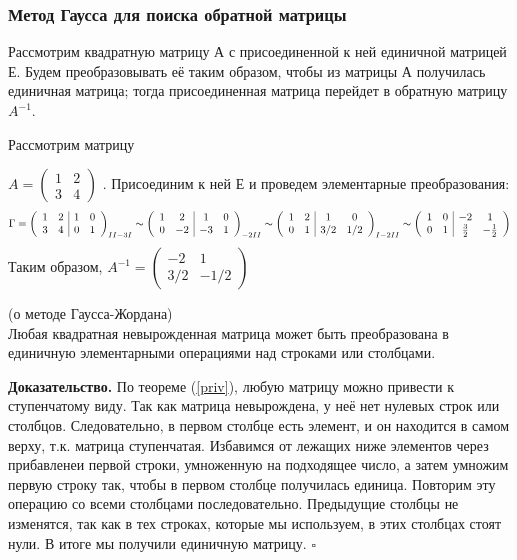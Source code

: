 \subsubsection{Метод Гаусса для поиска обратной матрицы}
Рассмотрим квадратную матрицу А с присоединенной к ней единичной матрицей Е.
Будем преобразовывать её таким образом, чтобы из матрицы А получилась единичная
матрица; тогда присоединенная матрица перейдет в обратную матрицу $A^{-1}$.
\begin{example}
Рассмотрим матрицу
\end{example}
$A=\left( \begin{array}{cc}
    1 &2\\
     3&4 
\end{array} \right)$ . Присоединим к ней Е и проведем элементарные 
преобразования:
$$\Gamma =\left( \begin{array}{ccccc}
    1 &2&\multicolumn{1}{|c}{1}&0 \\
     3&4&\multicolumn{1}{|c}{0}&1 
\end{array} \right)_{II-3I} \sim 
\left( \begin{array}{ccccc}
    1 &2&\multicolumn{1}{|c}{1}&0 \\
     0&-2&\multicolumn{1}{|c}{-3}&1 
\end{array} \right)_{-2II} \sim
\left( \begin{array}{ccccc}
    1 &2&\multicolumn{1}{|c}{1}&0 \\
     0&1&\multicolumn{1}{|c}{3/2}&1/2 
\end{array} \right)_{I-2II} \sim
\left( \begin{array}{ccccc}
    1 &0&\multicolumn{1}{|c}{-2}&1 \\
     0&1&\multicolumn{1}{|c}{\frac{3}{2}}&-\frac{1}{2} 
\end{array} \right)
$$
Таким образом, $A^{-1}=\left( \begin{array}{cc}
-2&1\\
3/2&-1/2
\end{array} \right)$
\begin{theor}
(о методе Гаусса-Жордана)\\
Любая квадратная невырожденная матрица может быть преобразована в единичную 
элементарными операциями над строками или столбцами. 
\end{theor}
\textbf{Доказательство.} По теореме (\ref{priv}), любую матрицу можно привести 
к ступенчатому виду. Так как матрица невырождена, у неё нет нулевых строк или 
столбцов. Следовательно, в первом столбце есть элемент, и он находится в самом
верху, т.к. матрица ступенчатая. Избавимся от лежащих ниже элементов через 
прибавленеи первой строки, умноженную на подходящее число, а затем умножим
первую строку так, чтобы в первом столбце получилась единица. Повторим эту 
операцию со всеми столбцами последовательно. Предыдущие столбцы не изменятся, 
так как в тех строках, которые мы используем, в этих столбцах стоят нули. 
В итоге мы получили единичную матрицу. $\square$


